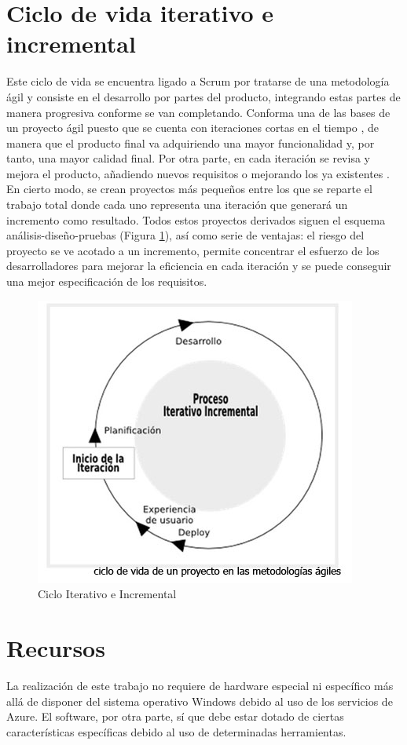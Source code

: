 \section{Ciclo de vida iterativo e incremental}
Este ciclo de vida se encuentra ligado a Scrum por tratarse de una metodología ágil y consiste en el desarrollo por partes del producto, integrando estas partes de manera progresiva conforme se van completando. Conforma una de las bases de un proyecto ágil puesto que se cuenta con iteraciones cortas en el tiempo \cite{javiergarzas2012}, de manera que el producto final va adquiriendo una mayor funcionalidad y, por tanto, una mayor calidad final. Por otra parte, en cada iteración se revisa y mejora el producto, añadiendo nuevos requisitos o mejorando los ya existentes \cite{proyectosagiles}. En cierto modo, se crean proyectos más pequeños entre los que se reparte el trabajo total donde cada uno representa una iteración que generará un incremento como resultado. Todos estos proyectos derivados siguen el esquema análisis-diseño-pruebas (Figura \ref{fig:iteraincr}), así como serie de ventajas: el riesgo del proyecto se ve acotado a un incremento, permite concentrar el esfuerzo de los desarrolladores para mejorar la eficiencia en cada iteración y se puede conseguir una mejor especificación de los requisitos.

\begin{figure}[h]
  \centering
  \includegraphics[width=0.52\linewidth]{figures/images/ciclo_iterativo_incremental.jpg}
  \caption{Ciclo Iterativo e Incremental}
  \label{fig:iteraincr}
\end{figure}

\clearpage

\section{Recursos}
La realización de este trabajo no requiere de hardware especial ni específico más allá de disponer del sistema operativo Windows debido al uso de los servicios de Azure. El software, por otra parte, sí que debe estar dotado de ciertas características específicas debido al uso de determinadas herramientas.

